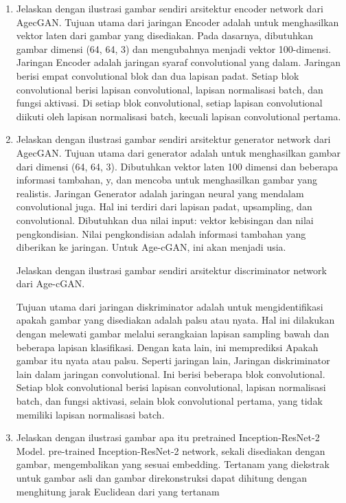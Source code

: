 \begin{enumerate}
	\item Jelaskan dengan ilustrasi gambar sendiri arsitektur encoder network dari AgecGAN.
	\hfill \break
	Tujuan utama dari jaringan Encoder adalah untuk menghasilkan vektor laten dari gambar yang disediakan. Pada dasarnya, dibutuhkan gambar dimensi (64, 64, 3) dan mengubahnya menjadi vektor 100-dimensi. Jaringan Encoder adalah jaringan syaraf convolutional yang dalam. Jaringan berisi empat convolutional blok dan dua lapisan padat. Setiap blok convolutional berisi lapisan convolutional, lapisan normalisasi batch, dan fungsi aktivasi. Di setiap blok convolutional, setiap lapisan convolutional diikuti oleh lapisan normalisasi batch, kecuali lapisan convolutional pertama. 
	
	\item Jelaskan dengan ilustrasi gambar sendiri arsitektur generator network dari AgecGAN.
	\hfill \break
	Tujuan utama dari generator adalah untuk menghasilkan gambar dari dimensi (64, 64, 3). Dibutuhkan vektor laten 100 dimensi dan beberapa informasi tambahan, y, dan mencoba untuk menghasilkan gambar yang realistis. Jaringan Generator adalah jaringan neural yang mendalam convolutional juga. Hal ini terdiri dari lapisan padat, upsampling, dan convolutional. Dibutuhkan dua nilai input: vektor kebisingan dan nilai pengkondisian. Nilai pengkondisian adalah informasi tambahan yang diberikan ke jaringan. Untuk Age-cGAN, ini akan menjadi usia.
	
	Jelaskan dengan ilustrasi gambar sendiri arsitektur discriminator network dari Age-cGAN.
	\hfill \break


	Tujuan utama dari jaringan diskriminator adalah untuk mengidentifikasi apakah gambar yang disediakan adalah palsu atau nyata. Hal ini dilakukan dengan melewati gambar melalui serangkaian lapisan sampling bawah dan beberapa lapisan klasifikasi. Dengan kata lain, ini memprediksi Apakah gambar itu nyata atau palsu. Seperti jaringan lain, Jaringan diskriminator lain dalam jaringan convolutional. Ini berisi beberapa blok convolutional. Setiap blok convolutional berisi lapisan convolutional, lapisan normalisasi batch, dan fungsi aktivasi, selain blok convolutional pertama, yang tidak memiliki lapisan normalisasi batch.
	
	\item Jelaskan dengan ilustrasi gambar apa itu pretrained Inception-ResNet-2 Model.
	\hfill \break
	pre-trained Inception-ResNet-2 network, sekali disediakan dengan gambar, mengembalikan yang sesuai embedding. Tertanam yang diekstrak untuk gambar asli dan gambar direkonstruksi dapat dihitung dengan menghitung jarak Euclidean dari yang tertanam
	

\end{enumerate}
